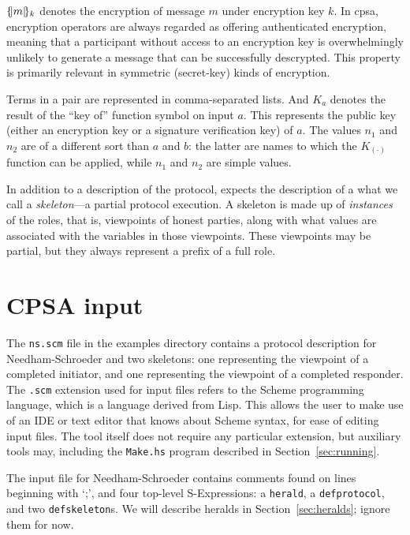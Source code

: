 $\{\!|m|\!\}_{k}$ denotes the encryption of message $m$ under encryption
key $k$.  In {cpsa}, encryption operators are always regarded as
offering authenticated encryption, meaning that a participant without
access to an encryption key is overwhelmingly unlikely to generate a
message that can be successfully descrypted.  This property is
primarily relevant in symmetric (secret-key) kinds of encryption.

Terms in a pair are represented in comma-separated lists.  And $K_a$
denotes the result of the ``key of'' function symbol on input $a$.
This represents the public key (either an encryption key or a
signature verification key) of $a$.  The values $n_1$ and $n_2$ are of
a different sort than $a$ and $b$: the latter are names to which the
$K_{(\cdot)}$ function can be applied, while $n_1$ and $n_2$ are
simple values.

In addition to a description of the protocol, {\cpsa} expects the
description of a what we call a \emph{skeleton}---a partial protocol
execution.  A skeleton is made up of \emph{instances} of the roles, that is,
viewpoints of honest parties, along with what values are associated with the
variables in those viewpoints.  These viewpoints may be partial, but they
always represent a prefix of a full role.

\section{CPSA input}

 The \texttt{ns.scm} file in the examples
directory contains a protocol description for Needham-Schroeder and
two skeletons: one representing the viewpoint of a completed
initiator, and one representing the viewpoint of a completed
responder.  The \texttt{.scm} extension used for {\cpsa} input files
refers to the Scheme programming language, which is a language derived
from Lisp.  This allows the user to make use of an IDE or text editor
that knows about Scheme syntax, for ease of editing input files.  The
{\cpsa} tool itself does not require any particular extension, but
auxiliary tools may, including the \texttt{Make.hs} program described
in Section~\ref{sec:running}.

  The input file for
Needham-Schroeder contains comments found on lines beginning with `;',
and four top-level S-Expressions: a \texttt{herald}, a \texttt{defprotocol},
and two \texttt{defskeleton}s.  We will describe heralds in
Section~\ref{sec:heralds}; ignore them for now.

